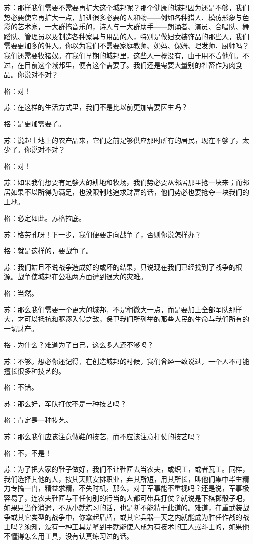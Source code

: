 \documentclass[11pt,oneside]{book}
\begin{document}
\begin{common-format}
苏：那样我们需要不需要再扩大这个城邦呢？那个健康的城邦因为还是不够，我们势必要使它再扩大一点，加进很多必要的人和物——例如各种猎人、模仿形象与色彩的艺术家，一大群搞音乐的，诗人与一大群助手——朗诵者、演员、合唱队、舞蹈队、管理员以及制造各种家具与用品的人，特别是做妇女装饰品的那些人，我们需要更加多的佣人。你以为我们不需要家庭教师、奶妈、保姆、理发师、厨师吗？我们还需要牧猪奴。在我们早期的城邦里，这些人一概没有，由于用不着他们。不过，在目前这个城邦里，便有这个需要了。我们还是需要大量别的牲畜作为肉食品。你说对不对？

格：对！

苏：在这样的生活方式里，我们不是比以前更加需要医生吗？

格：是更加需要了。

苏：说起土地上的农产品来，它们之前足够供应那时所有的居民，现在不够了，太少了。你说对不对？

格：对！

苏：如果我们想要有足够大的耕地和牧场，我们势必要从邻居那里抢一块来；而邻居如果不以所得为满足，也没限制地追求财富的话，他们势必也要抢夺一块我们的土地。

格：必定如此。苏格拉底。

苏：格劳孔呀！下一步，我们便要走向战争了，否则你说怎样办？

格：就是这样的，要战争了。

苏：我们姑且不说战争造成好的或坏的结果，只说现在我们已经找到了战争的根源。战争使城邦在公私两方面遭到很大的灾难。

格：当然。

苏：那么我们需要一个更大的城邦，不是稍微大一点，而是要加上全部军队那样大，才可以抵抗和驱逐入侵之敌，保卫我们所列举的那些人民的生命与我们所有的一切财产。

格：为什么？难道为了自己，这么多人还不够吗？

苏：不够。想必你还记得，在创造城邦的时候，我们曾经一致说过，一个人不可能擅长很多种技艺的。

格：不错。

苏：那么好，军队打仗不是一种技艺吗？

格：肯定是一种技艺。

苏：那么我们应该注意做鞋的技艺，而不应该注意打仗的技艺吗？

格：不，不是！

苏：为了把大家的鞋子做好，我们不让鞋匠去当农夫，或织工，或者瓦工。同样，我们选择其他的人，按其天赋安排职业，弃其所短，用其所长，叫他们集中毕生精力专搞一门，精益求精，不失时机。那么，对于军事能不重视吗？还是说，军事极容易了，连农夫鞋匠与干任何别的行当的人都可带兵打仗？就说是下棋掷骰子吧，如果只当作消遣，不从小就练习的话，也是断不能精于此道的。难道，在重武装战争或其它类型的战争中，你拿起盾牌，或其它兵器一天之内就能成为胜任作战的战士吗？须知，没有一种工具是拿到手就能使人成为有技术的工人或斗士的，如果他不懂得怎么用工具，没有认真练习过的话。


\end{common-format}
\end{document}

